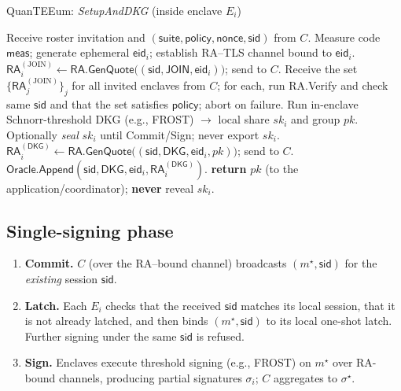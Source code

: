 \documentclass[runningheads,orivec]{llncs}
\newcommand{\prot}{\textsf{QuanTEEum}}
\newcommand{\FROST}{\textsf{FROST}}
\begin{document}
\begin{algorithm}[!htbp]
\caption{\prot{}: \emph{SetupAndDKG} (inside enclave $E_i$)}
\label{alg:setup}
\begin{small}
\begin{algorithmic}[1]
\State Receive roster invitation and $(\mathsf{suite},\mathsf{policy},\mathsf{nonce},\mathsf{sid})$ from $C$.
\State Measure code $\mathsf{meas}$; generate ephemeral $\mathsf{eid}_i$; establish RA--TLS channel bound to $\mathsf{eid}_i$.
\State $\mathsf{RA}^{(\mathrm{JOIN})}_i \gets \textsf{RA.GenQuote}\big((\mathsf{sid},\mathsf{JOIN},\mathsf{eid}_i)\big)$; send to $C$.
\State Receive the set $\{\mathsf{RA}^{(\mathrm{JOIN})}_j\}_j$ for all invited enclaves from $C$; for each, run \textsf{RA.Verify} and check same $\mathsf{sid}$ and that the set satisfies $\mathsf{policy}$; abort on failure.
\State Run in\mbox{-}enclave Schnorr-threshold DKG (e.g., \FROST{}) $\rightarrow$ local share $sk_i$ and group $pk$.
\State Optionally \emph{seal} $sk_i$ until Commit/Sign; never export $sk_i$.
\State $\mathsf{RA}^{(\mathsf{DKG})}_i \gets \textsf{RA.GenQuote}\big((\mathsf{sid},\mathsf{DKG},\mathsf{eid}_i,pk)\big)$; send to $C$.
\State $\textsf{Oracle.Append}(\mathsf{sid},\mathsf{DKG},\mathsf{eid}_i,\mathsf{RA}^{(\mathsf{DKG})}_i)$.
\State \textbf{return} $pk$ (to the application/coordinator); \textbf{never} reveal $sk_i$.
\end{algorithmic}
\end{small}
\end{algorithm}

\subsection{Single-signing phase}
\begin{enumerate}[leftmargin=*,itemsep=0.25em]
  \item \textbf{Commit.} $C$ (over the RA–bound channel) broadcasts $(m^{\star},\mathsf{sid})$ for the \emph{existing} session $\mathsf{sid}$.
  \item \textbf{Latch.} Each $E_i$ checks that the received $\mathsf{sid}$ matches its local session, that it is not already latched, and then binds $(m^{\star},\mathsf{sid})$ to its local one-shot latch. Further signing under the same $\mathsf{sid}$ is refused.
  \item \textbf{Sign.} Enclaves execute threshold signing (e.g., \FROST{}) on $m^{\star}$ over RA-bound channels, producing partial signatures $\sigma_i$; $C$ aggregates to $\sigma^{\star}$.
\end{enumerate}
\end{document}
